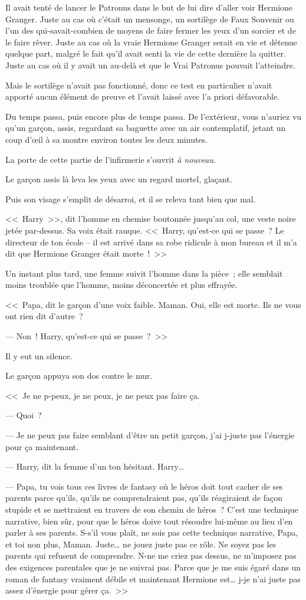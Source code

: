 Il avait tenté de lancer le Patronus dans le but de lui dire d'aller voir Hermione Granger. Juste au cas où c'était un mensonge, un sortilège de Faux Souvenir ou l'un des qui-savait-combien de moyens de faire fermer les yeux d'un sorcier et de le faire rêver. Juste au cas où la vraie Hermione Granger serait en vie et détenue quelque part, malgré le fait qu'il avait senti la vie de cette dernière la quitter. Juste au cas où il y avait un au-delà et que le Vrai Patronus pouvait l'atteindre.

Mais le sortilège n'avait pas fonctionné, donc ce test en particulier n'avait apporté aucun élément de preuve et l'avait laissé avec l'a priori défavorable.

Du temps passa, puis encore plus de temps passa. De l'extérieur, vous n'auriez vu qu'un garçon, assis, regardant sa baguette avec un air contemplatif, jetant un coup d'œil à sa montre environ toutes les deux minutes.

La porte de cette partie de l'infirmerie s'ouvrit \emph{à nouveau}.

Le garçon assis là leva les yeux avec un regard mortel, glaçant.

Puis son visage s'emplit de désarroi, et il se releva tant bien que mal.

<<~Harry~>>, dit l'homme en chemise boutonnée jusqu'au col, une veste noire jetée par-dessus. Sa voix était rauque. <<~Harry, qu'est-ce qui se passe~? Le directeur de ton école -- il est arrivé dans sa robe ridicule à mon bureau et il m'a dit que Hermione Granger était morte~!~>>

Un instant plus tard, une femme suivit l'homme dans la pièce~; elle semblait moins troublée que l'homme, moins déconcertée et plus effrayée.

<<~Papa, dit le garçon d'une voix faible. Maman. Oui, elle est morte. Ils ne vous ont rien dit d'autre~?

--- Non~! Harry, qu'est-ce qui se passe~?~>>

Il y eut un silence.

Le garçon appuya son dos contre le mur.

<<~Je ne p-peux, je ne peux, je ne peux pas faire ça.

--- Quoi~?

--- Je ne peux pas faire semblant d'être un petit garçon, j'ai j-juste pas l'énergie pour ça maintenant.

--- Harry, dit la femme d'un ton hésitant. Harry…

--- Papa, tu vois tous ces livres de fantasy où le héros doit tout cacher de ses parents parce qu'ils, qu'ils ne comprendraient pas, qu'ils réagiraient de façon stupide et se mettraient en travers de son chemin de héros~? C'est une technique narrative, bien sûr, pour que le héros doive tout résoudre lui-même au lieu d'en parler à ses parents. S-s'il vous plaît, ne sois pas cette technique narrative, Papa, et toi non plus, Maman. Juste… ne jouez juste pas ce rôle. Ne soyez pas les parents qui refusent de comprendre. N-ne me criez pas dessus, ne m'imposez pas des exigences parentales que je ne suivrai pas. Parce que je me suis égaré dans un roman de fantasy vraiment débile et maintenant Hermione est… j-je n'ai juste pas assez d'énergie pour gérer ça.~>>

